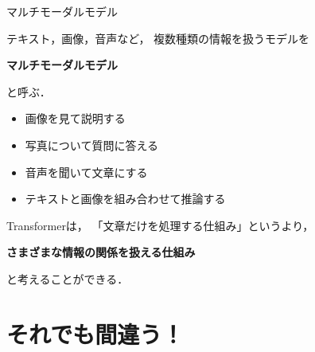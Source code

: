 \documentclass[aspectratio=169,professionalfonts]{beamer}
\begin{document}
\begin{frame}{マルチモーダルモデル}

  テキスト，画像，音声など，
  複数種類の情報を扱うモデルを

  \begin{center}
    \textbf{マルチモーダルモデル}
  \end{center}

  と呼ぶ．

  \vspace{1em}

  \begin{itemize}
    \item 画像を見て説明する
    \item 写真について質問に答える
    \item 音声を聞いて文章にする
    \item テキストと画像を組み合わせて推論する
  \end{itemize}

  \vspace{1em}

  Transformerは，
  「文章だけを処理する仕組み」というより，

  \begin{center}
    \textbf{さまざまな情報の関係を扱える仕組み}
  \end{center}

  と考えることができる．


\end{frame}



\section{それでも間違う！}
\end{document}
